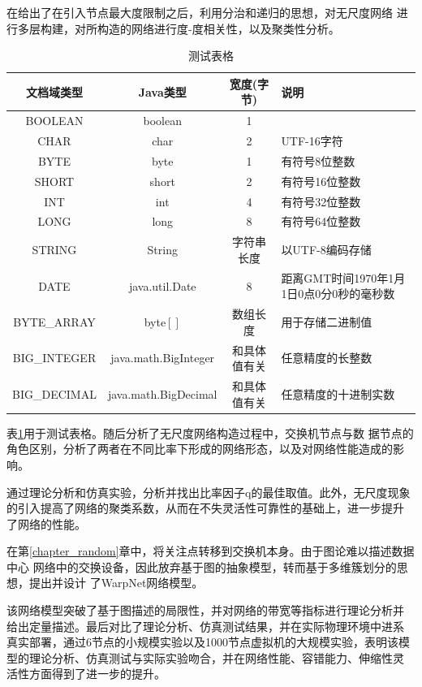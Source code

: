 \documentclass[bachelor,winfonts]{jnuthesis} %
\begin{document}
    在给出了在引入节点最大度限制之后，利用分治和递归的思想，对无尺度网络
    进行多层构建，对所构造的网络进行度-度相关性，以及聚类性分析。
    
    \begin{table}
        \centering
        \begin{tabular}{cccp{38mm}}
            \toprule
            \textbf{文档域类型} & \textbf{Java类型} & \textbf{宽度(字节)} & \textbf{说明} \\
            \midrule
            BOOLEAN  & boolean &  1  & \\
            CHAR     & char    &  2  & UTF-16字符 \\
            BYTE     & byte    &  1  & 有符号8位整数 \\
            SHORT    & short   &  2  & 有符号16位整数 \\
            INT      & int     &  4  & 有符号32位整数 \\
            LONG     & long    &  8  & 有符号64位整数 \\
            STRING   & String  &  字符串长度  & 以UTF-8编码存储 \\
            DATE     & java.util.Date & 8 & 距离GMT时间1970年1月1日0点0分0秒的毫秒数 \\
            BYTE\_ARRAY & byte$[]$ & 数组长度 & 用于存储二进制值 \\
            BIG\_INTEGER & java.math.BigInteger & 和具体值有关 & 任意精度的长整数 \\
            BIG\_DECIMAL & java.math.BigDecimal & 和具体值有关 & 任意精度的十进制实数 \\
            \bottomrule
        \end{tabular}
        \caption{测试表格}\label{table:test5}
    \end{table}
    
    表\ref{table:test5}用于测试表格。随后分析了无尺度网络构造过程中，交换机节点与数
    据节点的角色区别，分析了两者在不同比率下形成的网络形态，以及对网络性能造成的影响。
    
    通过理论分析和仿真实验，分析并找出比率因子q的最佳取值。此外，无尺度现象
    的引入提高了网络的聚类系数，从而在不失灵活性可靠性的基础上，进一步提升
    了网络的性能。
    
    在第\ref{chapter_random}章中，将关注点转移到交换机本身。由于图论难以描述数据中心
    网络中的交换设备，因此放弃基于图的抽象模型，转而基于多维簇划分的思想，提出并设计
    了WarpNet网络模型。
    
    该网络模型突破了基于图描述的局限性，并对网络的带宽等指标进行理论分析并
    给出定量描述。最后对比了理论分析、仿真测试结果，并在实际物理环境中进系
    真实部署，通过6节点的小规模实验以及1000节点虚拟机的大规模实验，表明该模
    型的理论分析、仿真测试与实际实验吻合，并在网络性能、容错能力、伸缩性灵
    活性方面得到了进一步的提升。
    
\end{document}
